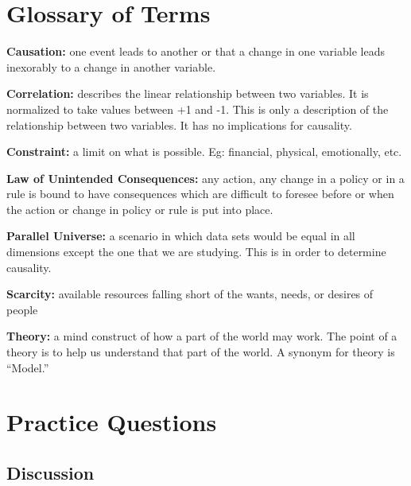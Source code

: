 \documentclass[
]{book}
\begin{document}
\hypertarget{glossary-of-terms}{%
\section{Glossary of Terms}\label{glossary-of-terms}}

\textbf{Causation:} one event leads to another or that a change in one variable leads inexorably to a change in another variable.

\textbf{Correlation:} describes the linear relationship between two variables. It is normalized to take values between +1 and -1. This is only a description of the relationship between two variables. It has no implications for causality.

\textbf{Constraint:} a limit on what is possible. Eg: financial, physical, emotionally, etc.

\textbf{Law of Unintended Consequences:} any action, any change in a policy or in a rule is bound to have consequences which are difficult to foresee before or when the action or change in policy or rule is put into place.

\textbf{Parallel Universe:} a scenario in which data sets would be equal in all dimensions except the one that we are studying. This is in order to determine causality.

\textbf{Scarcity:} available resources falling short of the wants, needs, or desires of people

\textbf{Theory:} a mind construct of how a part of the world may work. The point of a theory is to help us understand that part of the world. A synonym for theory is ``Model.''

\hypertarget{practice-questions}{%
\section{Practice Questions}\label{practice-questions}}

\hypertarget{discussion}{%
\subsection{Discussion}\label{discussion}}
\end{document}
